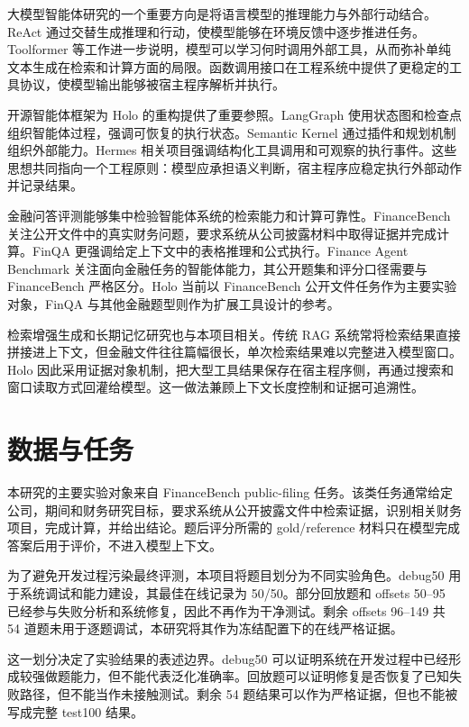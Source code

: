 \documentclass[12pt,a4paper,UTF8]{ctexart}
\begin{document}
大模型智能体研究的一个重要方向是将语言模型的推理能力与外部行动结合。ReAct 通过交替生成推理和行动，使模型能够在环境反馈中逐步推进任务\cite{yao2022react}。Toolformer 等工作进一步说明，模型可以学习何时调用外部工具，从而弥补单纯文本生成在检索和计算方面的局限\cite{schick2023toolformer}。函数调用接口在工程系统中提供了更稳定的工具协议，使模型输出能够被宿主程序解析并执行。

开源智能体框架为 Holo 的重构提供了重要参照。LangGraph 使用状态图和检查点组织智能体过程，强调可恢复的执行状态。Semantic Kernel 通过插件和规划机制组织外部能力。Hermes 相关项目强调结构化工具调用和可观察的执行事件。这些思想共同指向一个工程原则：模型应承担语义判断，宿主程序应稳定执行外部动作并记录结果。

金融问答评测能够集中检验智能体系统的检索能力和计算可靠性。FinanceBench 关注公开文件中的真实财务问题，要求系统从公司披露材料中取得证据并完成计算\cite{islam2023financebench}。FinQA 更强调给定上下文中的表格推理和公式执行\cite{chen2021finqa}。Finance Agent Benchmark 关注面向金融任务的智能体能力，其公开题集和评分口径需要与 FinanceBench 严格区分。Holo 当前以 FinanceBench 公开文件任务作为主要实验对象，FinQA 与其他金融题型则作为扩展工具设计的参考。

检索增强生成和长期记忆研究也与本项目相关。传统 RAG 系统常将检索结果直接拼接进上下文，但金融文件往往篇幅很长，单次检索结果难以完整进入模型窗口。Holo 因此采用证据对象机制，把大型工具结果保存在宿主程序侧，再通过搜索和窗口读取方式回灌给模型。这一做法兼顾上下文长度控制和证据可追溯性。

\section{数据与任务}

本研究的主要实验对象来自 FinanceBench public-filing 任务。该类任务通常给定公司，期间和财务研究目标，要求系统从公开披露文件中检索证据，识别相关财务项目，完成计算，并给出结论。题后评分所需的 gold/reference 材料只在模型完成答案后用于评价，不进入模型上下文。

为了避免开发过程污染最终评测，本项目将题目划分为不同实验角色。debug50 用于系统调试和能力建设，其最佳在线记录为 50/50。部分回放题和 offsets 50--95 已经参与失败分析和系统修复，因此不再作为干净测试。剩余 offsets 96--149 共 54 道题未用于逐题调试，本研究将其作为冻结配置下的在线严格证据。

这一划分决定了实验结果的表述边界。debug50 可以证明系统在开发过程中已经形成较强做题能力，但不能代表泛化准确率。回放题可以证明修复是否恢复了已知失败路径，但不能当作未接触测试。剩余 54 题结果可以作为严格证据，但也不能被写成完整 test100 结果。
\end{document}
